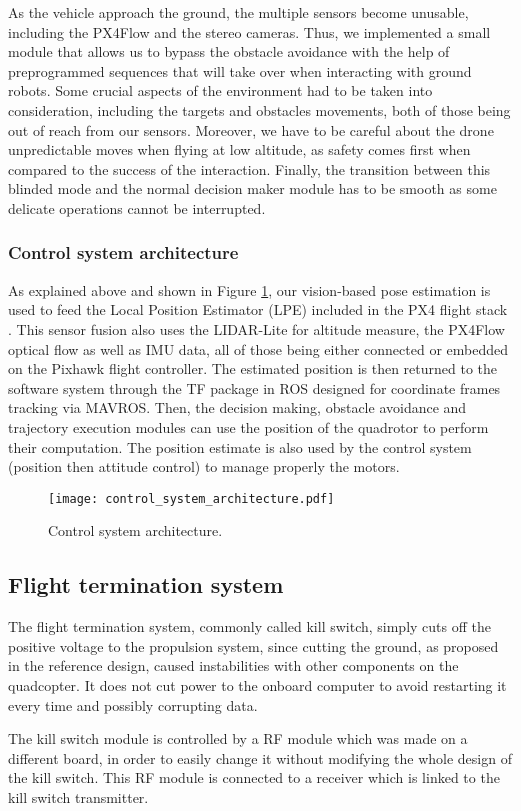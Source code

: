 As the vehicle approach the ground, the multiple sensors become unusable, including the PX4Flow and the stereo cameras. Thus, we implemented a small module that allows us to bypass the obstacle avoidance with the help of preprogrammed sequences that will take over when interacting with ground robots. Some crucial aspects of the environment had to be taken into consideration, including the targets and obstacles movements, both of those being out of reach from our sensors. Moreover, we have to be careful about the drone unpredictable moves when flying at low altitude, as safety comes first when compared to the success of the interaction. Finally, the transition between this blinded mode and the normal decision maker module has to be smooth as some delicate operations cannot be interrupted.

\subsubsection*{Control system architecture}

As explained above and shown in Figure \ref{fig:gnc-controlsystem}, our vision-based pose estimation is used to feed the Local Position Estimator (LPE) included in the PX4 flight stack \cite{feng2016research}. This sensor fusion also uses the LIDAR-Lite for altitude measure, the PX4Flow optical flow as well as IMU data, all of those being either connected or embedded on the Pixhawk flight controller. The estimated position is then returned to the software system through the TF package \cite{foote2013tf} in ROS designed for coordinate frames tracking via MAVROS. Then, the decision making, obstacle avoidance and trajectory execution modules can use the position of the quadrotor to perform their computation. The position estimate is also used by the control system (position then attitude control) to manage properly the motors.

\begin{figure}[h]
	\texttt{[image: control\_system\_architecture.pdf]}
	\vspace{-0.5cm}
	\caption{Control system architecture.}
	\label{fig:gnc-controlsystem}
\end{figure}

\subsection*{Flight termination system} \label{subsec:vehicle-killswitch}

The flight termination system, commonly called kill switch, simply cuts off the positive voltage to the propulsion system, since cutting the ground, as proposed in the reference design, caused instabilities with other components on the quadcopter. It does not cut power to the onboard computer to avoid restarting it every time and possibly corrupting data.

The kill switch module is controlled by a RF module which was made on a different board, in order to easily change it without modifying the whole design of the kill switch. This RF module is connected to a receiver which is linked to the kill switch transmitter.
